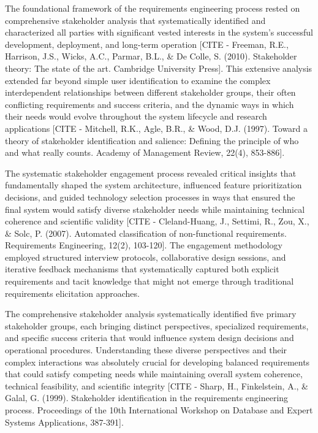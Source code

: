 \documentclass[12pt,a4paper]{article}
\begin{document}
The foundational framework of the requirements engineering process rested on comprehensive stakeholder analysis that
systematically identified and characterized all parties with significant vested interests in the system's successful
development, deployment, and long-term
operation [CITE - Freeman, R.E., Harrison, J.S., Wicks, A.C., Parmar, B.L., \& De Colle, S. (2010). Stakeholder theory: The state of the art. Cambridge University Press].
This extensive analysis extended far beyond simple user identification to examine the complex interdependent
relationships between different stakeholder groups, their often conflicting requirements and success criteria, and the
dynamic ways in which their needs would evolve throughout the system lifecycle and research
applications [CITE - Mitchell, R.K., Agle, B.R., \& Wood, D.J. (1997). Toward a theory of stakeholder identification and salience: Defining the principle of who and what really counts. Academy of Management Review, 22(4), 853-886].

The systematic stakeholder engagement process revealed critical insights that fundamentally shaped the system
architecture, influenced feature prioritization decisions, and guided technology selection processes in ways that
ensured the final system would satisfy diverse stakeholder needs while maintaining technical coherence and scientific
validity [CITE - Cleland-Huang, J., Settimi, R., Zou, X., \& Solc, P. (2007). Automated classification of non-functional requirements. Requirements Engineering, 12(2), 103-120].
The engagement methodology employed structured interview protocols, collaborative design sessions, and iterative
feedback mechanisms that systematically captured both explicit requirements and tacit knowledge that might not emerge
through traditional requirements elicitation approaches.

The comprehensive stakeholder analysis systematically identified five primary stakeholder groups, each bringing distinct
perspectives, specialized requirements, and specific success criteria that would influence system design decisions and
operational procedures. Understanding these diverse perspectives and their complex interactions was absolutely crucial
for developing balanced requirements that could satisfy competing needs while maintaining overall system coherence,
technical feasibility, and scientific
integrity [CITE - Sharp, H., Finkelstein, A., \& Galal, G. (1999). Stakeholder identification in the requirements engineering process. Proceedings of the 10th International Workshop on Database and Expert Systems Applications, 387-391].
\end{document}
